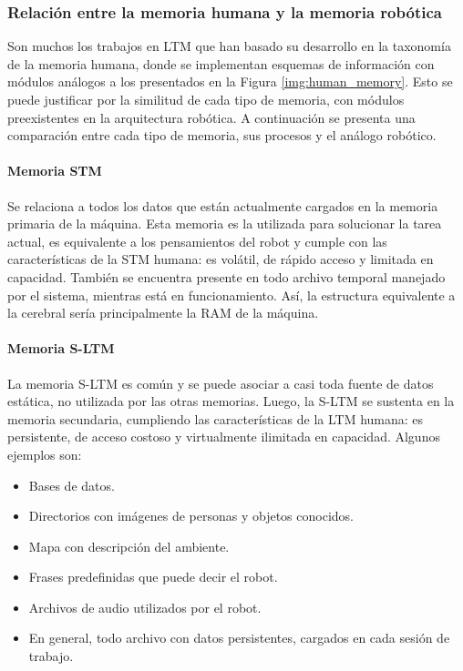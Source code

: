 \subsubsection{Relación entre la memoria humana y la memoria robótica}
Son muchos los trabajos en LTM que han basado su desarrollo en la taxonomía de la memoria humana, donde se implementan esquemas de información con módulos análogos a los presentados en la Figura \ref{img:human_memory}. Esto se puede justificar por la similitud de cada tipo de memoria, con módulos preexistentes en la arquitectura robótica. A continuación se presenta una comparación entre cada tipo de memoria, sus procesos y el análogo robótico.


\paragraph{Memoria STM}
Se relaciona a todos los datos que están actualmente cargados en la memoria primaria de la máquina. Esta memoria es la utilizada para solucionar la tarea actual, es equivalente a los pensamientos del robot y cumple con las características de la STM humana: es volátil, de rápido acceso y limitada en capacidad. También se encuentra presente en todo archivo temporal manejado por el sistema, mientras está en funcionamiento. Así, la estructura equivalente a la cerebral sería principalmente la RAM de la máquina.

\paragraph{Memoria S-LTM}
La memoria S-LTM es común y se puede asociar a casi toda fuente de datos estática, no utilizada por las otras memorias. Luego, la S-LTM se sustenta en la memoria secundaria, cumpliendo las características de la LTM humana: es persistente, de acceso costoso y virtualmente ilimitada en capacidad. Algunos ejemplos son:
\begin{itemize}[topsep=0pt]
	\item Bases de datos.
	\item Directorios con imágenes de personas y objetos conocidos.
	\item Mapa con descripción del ambiente.
	\item Frases predefinidas que puede decir el robot.
	\item Archivos de audio utilizados por el robot.
	\item En general, todo archivo con datos persistentes, cargados en cada sesión de trabajo.
\end{itemize}


